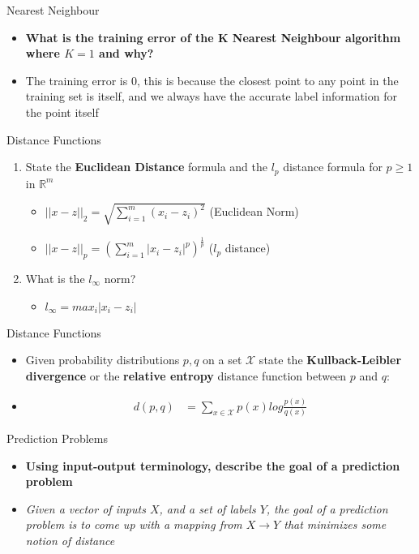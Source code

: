 \documentclass{beamer}
\begin{document}
%
\begin{frame}{Nearest Neighbour}
    \begin{itemize}
        \item<1-> \textbf{What is the training error of the \textbf{K Nearest Neighbour} algorithm where $K=1$ and why?}
        \item<2-> The training error is 0, this is because the closest point to any point in the training set is itself, and we always have the accurate label information for the point itself
    \end{itemize}
\end{frame}
%
\begin{frame}{Distance Functions}
    \begin{enumerate}
        \item<1-> State the \textbf{Euclidean Distance} formula and the $l_p$ distance formula for $p \geq 1$ in $\mathbb{R}^m$ \begin{itemize} 
            \item<2-> $||x-z||_2 = \sqrt{\sum^m_{i=1}(x_i - z_i)^2}$ (Euclidean Norm) \\
            \item<2-> $||x-z||_p = \left(\sum^m_{i=1}|x_i-z_i|^p\right)^{\frac{1}{p}}$ ($l_p$ distance)
        \end{itemize}
        \item<1-> What is the $l_{\infty}$ norm? \begin{itemize}
            \item <3->$l_{\infty} = max_{i}|x_i - z_i|$
        \end{itemize}
    \end{enumerate}
\end{frame}
%
\begin{frame}{Distance Functions}
    \begin{itemize}
        \item<1-> Given probability distributions $p, q$ on a set $\mathcal{X}$ state the \textbf{Kullback-Leibler divergence} or the \textbf{relative entropy} distance function between $p$ and $q$:
        \item<2->\begin{align*}
            d(p,q) &=\sum_{x \in \mathcal{X}}p(x)log\frac{p(x)}{q(x)}
        \end{align*}
    \end{itemize}
\end{frame}
\begin{frame}{Prediction Problems}
    \begin{itemize}
        \item<1-> \textbf{Using input-output terminology, describe the goal of a prediction problem}
        \item<2-> \textit{Given a vector of inputs $X$, and a set of labels $Y$, the goal of a prediction problem is to come up with a mapping from $X \rightarrow Y$ that minimizes some notion of distance}
    \end{itemize}
\end{frame}
\end{document}
